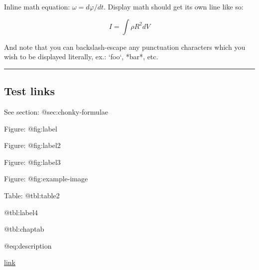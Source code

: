 \documentclass[
]{tufte-pandoc}
\begin{document}
Inline math equation: \(\omega = d\varphi / dt\). Display math should
get its own line like so:

\[I = \int \rho R^{2} dV\]

And note that you can backslash-escape any punctuation characters which
you wish to be displayed literally, ex.: `foo`, *bar*, etc.

\begin{center}\rule{0.5\linewidth}{0.5pt}\end{center}

\hypertarget{test-links}{%
\subsection{Test links}\label{test-links}}

See section: @sec:chonky-formulae

Figure: @fig:label

Figure: @fig:label2

Figure: @fig:label3

Figure: @fig:example-image

Table: @tbl:table2

@tbl:label4

@tbl:chaptab

@eq:description

\protect\hyperlink{fig:label1}{link}
\end{document}
